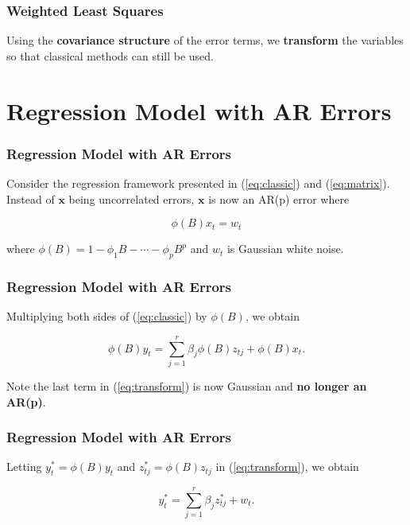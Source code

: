\documentclass[%
xcolor=pdftex]{beamer}
\begin{document}
\begin{frame}
\frametitle{Weighted Least Squares}

Using the \textbf{covariance structure} of the error terms, we \textbf{transform} the variables so that classical methods can still be used. 

\end{frame}

\section{Regression Model with AR Errors}
\frame{\tableofcontents[currentsection]}

\begin{frame}
\frametitle{Regression Model with AR Errors}

Consider the regression framework presented in (\ref{eq:classic}) and (\ref{eq:matrix}). Instead of $\boldsymbol{x}$ being uncorrelated errors, $\boldsymbol{x}$ is now an AR(p) error where

\begin{equation*}
\phi(B)x_t = w_t
\end{equation*}

where $\phi(B) = 1- \phi_1 B - \cdots - \phi_p B^p$ and $w_t$ is Gaussian white noise. 

\end{frame}

\begin{frame}
\frametitle{Regression Model with AR Errors}

Multiplying both sides of (\ref{eq:classic}) by $\phi(B)$, we obtain

\begin{equation} \label{eq:transform}
\phi(B) y_t = \sum_{j=1}^r \beta_j \phi(B) z_{tj} + \phi(B)x_t.
\end{equation}

Note the last term in (\ref{eq:transform}) is now Gaussian and \textbf{no longer an AR(p)}. 

\end{frame}

\begin{frame}
\frametitle{Regression Model with AR Errors}

Letting $y_t^* = \phi(B) y_t$ and $z_{tj}^* = \phi(B) z_{tj}$ in (\ref{eq:transform}), we obtain

\begin{equation} \label{eq:ar}
y_t^* = \sum_{j=1}^r \beta_j z_{tj}^* + w_t.
\end{equation}



\end{frame}
\end{document}
